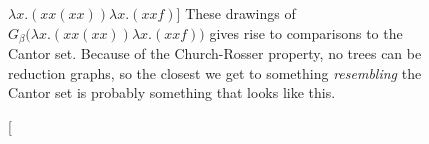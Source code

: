 \begin{figure}[htbp]
	\centering
	
	\caption
	[$\lambda x.(x x (x x)) \lambda x.(x x f)$]
	{These drawings of $G_\beta\big(\lambda x.(x x (x x)) \lambda x.(x x f)\big)$ 
	gives rise to comparisons to the Cantor set. Because of the Church-Rosser property,
	no trees can be reduction graphs, so the closest we get to something \emph{resembling}
	the Cantor set is probably something that looks like this.}
	\label{fig:images_grid_1_DOT}
\end{figure}


